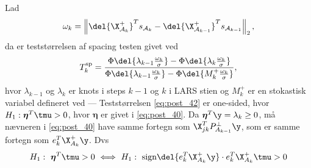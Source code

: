 Lad
\begin{align}
\omega_k = \left\Vert \del{\X_{\mathcal{A}_k}^+}^T s_{\mathcal{A}_k} -   \del{\X_{\mathcal{A}_{k-1}}^+}^T s_{\mathcal{A}_{k-1}} \right\Vert_2, \label{eq:post_41}
\end{align}
da er teststørrelsen af spacing testen givet ved
\begin{align}
T_k^\text{sp}= \frac{\Phi \del{\lambda_{k-1} \frac{\omega_k}{\sigma}} - \Phi \del{\lambda_{k} \frac{\omega_k}{\sigma}}}{\Phi \del{\lambda_{k-1} \frac{\omega_k}{\sigma}} - \Phi \del{M_{k}^+ \frac{\omega_k}{\sigma}}}, \label{eq:post_42}
\end{align}
hvor \(\lambda_{k-1}\) og \(\lambda_k\) er knots i steps \(k-1\) og \(k\) i LARS stien og \(M_k^+\) er en stokastisk variabel defineret ved
---
Teststørrelsen \eqref{eq:post_42} er one-sided, hvor \(H_1:\boldsymbol{\eta}^T \tmu > 0 \), hvor \(\boldsymbol{\eta}\) er givet i \eqref{eq:post_40}.
Da \(\boldsymbol{\eta}^T \y = \lambda_k \geq 0\), må nævneren i \eqref{eq:post_40} have samme fortegn som \(\X_{jk}^T P_{A_{k-1}}^\perp \y \), som er samme fortegn som \(e_k^T \X_{A_k}^+ \y\). Dvs
\begin{align*}
H_1: \ \boldsymbol{\eta}^T \tmu > 0 \ \Longleftrightarrow \ H_1: \ \text{sign} \del{e_k^T \X_{A_k}^+ \y} \cdot e_k^T \X_{A_k}^+ \tmu > 0
\end{align*}


